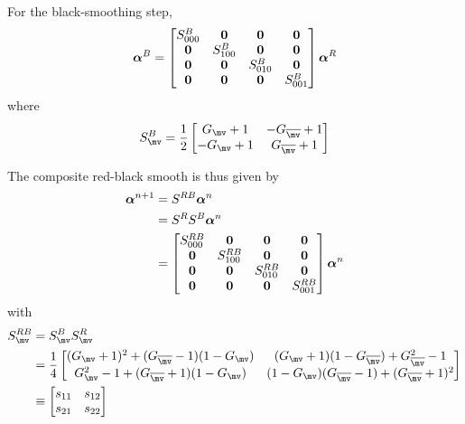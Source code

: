 \documentclass{article}
\begin{document}
For the black-smoothing step,
\[
  \boldsymbol{\alpha}^B
 = 
  \left[\begin{matrix} S^B_{000} & {\mathbf 0} & {\mathbf 0} &  {\mathbf 0} \\
                        {\mathbf 0} & S^B_{100} & {\mathbf 0} & {\mathbf 0} \\
                        {\mathbf 0} & {\mathbf 0} & S^B_{010} & {\mathbf 0}  \\
                        {\mathbf 0} & {\mathbf 0} & {\mathbf 0} & S^B_{001}  \\
          \end{matrix}\right]
  \boldsymbol{\alpha}^R
\]
where
\[ 
 S^B_\mv = {1\over 2}
   \left[\begin{matrix}
         G_\mv +1 & -G_{\mvb} +1 \\
        -G_\mv +1 &  G_{\mvb} +1 \\
   \end{matrix}\right]
\]

The composite red-black smooth is thus given by
\begin{align*}
  \boldsymbol{\alpha}^{n+1} &= S^{RB} \boldsymbol{\alpha}^n \\
    &= S^R S^B  \boldsymbol{\alpha}^n \\
    &  = 
  \left[\begin{matrix} S^{RB}_{000} & {\mathbf 0} & {\mathbf 0} &  {\mathbf 0} \\
                        {\mathbf 0} & S^{RB}_{100} & {\mathbf 0} & {\mathbf 0} \\
                        {\mathbf 0} & {\mathbf 0} & S^{RB}_{010} & {\mathbf 0}  \\
                        {\mathbf 0} & {\mathbf 0} & {\mathbf 0} & S^{RB}_{001}  \\
          \end{matrix}\right]
  \boldsymbol{\alpha}^n 
\end{align*}
with
\begin{align*}
 S^{RB}_\mv & = S^B_\mv S^R_\mv \\
   &=
  {1\over 4}
   \left[\begin{matrix} 
     (G_\mv+1)^2        + (G_\mvb-1)(1-G_\mv) & (G_\mv+1)(1-G_\mvb) + G_\mvb^2-1 \\
     G_\mv^2-1 + (G_\mvb+1)(1-G_\mv) & (1-G_\mv)(G_\mvb-1) + (G_\mvb+1)^2         \\
   \end{matrix}\right] \\
   &\equiv
     \left[\begin{matrix}
        s_{11} & s_{12} \\
        s_{21} & s_{22} 
     \end{matrix}\right]
\end{align*}
\end{document}
